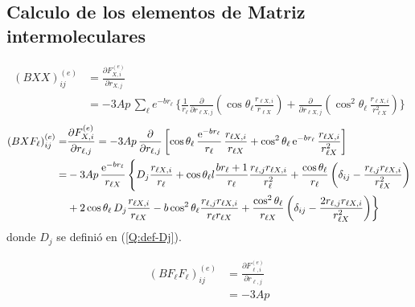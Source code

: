 \subsection{Calculo de los elementos de Matriz intermoleculares}
\label{S:elementos-matriz-intermolec}
\begin{align}
  (BXX)^{(e)}_{ij} &= \frac{\partial F^{(e)}_{X,i}}{\partial r_{X,j}} \\&= -3 A p \, \sum_{\ell} e^{-br_{\ell}} \, \Biggl\{\frac{1}{r_{\ell}}  \frac{\partial}{\partial r_{\ell X,j}} \left(\cos \theta_{\ell} \frac{r_{\ell X,i}}{r_{\ell X}} \right) + \frac{\partial}{\partial r_{\ell X,j}} \left(\cos^{2} \theta_{\ell}\, \frac{r_{\ell X,i}}{r_{\ell X}^{2}} \right) \biggr\}
\end{align}
\begin{align}
  (BXF_{\ell})^{(e)}_{ij} =& \frac{\partial F^{(e)}_{X,i}}{\partial r_{\ell,j}} = -3 A p \, \frac{\partial}{\partial r_{\ell,j}} \left[{\cos {\theta_{\ell}}}\, \frac{\mathrm{e}^{-b r_{\ell}}}{r_{\ell}}\, \frac{r_{\ell X,i}}{r_{\ell X}} + {\cos^{2}{\theta_{\ell}}} \,\mathrm{e}^{-b r_{\ell}}\, \frac{r_{\ell X,i}}{r_{\ell X}^{2}} \right] \nonumber \\
                    =& -3 A p \,\frac{\mathrm{e}^{-b r_{\ell}}}{r_{\ell X}}\,\Biggl\{ D_{j} \frac{r_{\ell X,i}}{r_{\ell}} + \cos \theta_{\ell}l \frac{b r_{\ell} + 1}{r_{\ell}} \frac{r_{\ell,j} r_{\ell X,i}}{r_{\ell}^{2}} + \frac{\cos \theta_{\ell}}{r_{\ell}} \left( \delta_{ij} -  \frac{r_{\ell,j} r_{\ell X,i}}{r_{\ell X}^{2}} \right) \nonumber \\
&+ 2 \cos \theta_{\ell} \, D_{j} \frac{r_{\ell X,i}}{r_{\ell X}} - b \cos^{2}{ \theta_{\ell}} \frac{r_{\ell,j} r_{\ell X,i}}{r_{\ell} r_{\ell X}}  +  \frac{\cos^{2}{ \theta_{\ell}}}{r_{\ell X}} \left( \delta_{ij} -  \frac{2 r_{\ell,j} r_{\ell X,i}}{r_{\ell X}^{2}} \right) \biggr\}
\end{align}
donde $D_{j}$ se defini\'{o} en (\ref{Q:def-Dj}).

\begin{align}
  (BF_{\ell}F_{\ell})^{(e)}_{ij} &= \frac{\partial F^{(e)}_{\ell,i}}{\partial r_{\ell,j}} \\&= -3 A p 
\end{align}


